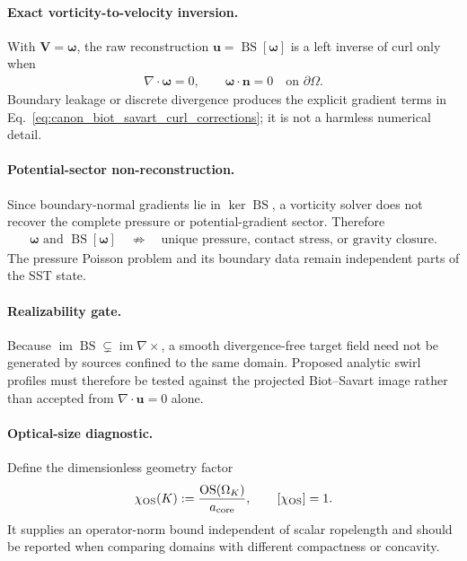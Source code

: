     \paragraph{Exact vorticity-to-velocity inversion.}
    With \(\mathbf V=\boldsymbol\omega\), the raw reconstruction
    \(\mathbf u=\operatorname{BS}[\boldsymbol\omega]\) is a left inverse of curl
    only when
    \begin{align}
        \nabla\cdot\boldsymbol\omega=0,
        \qquad
        \boldsymbol\omega\cdot\mathbf n=0
        \quad\text{on }\partial\Omega.
        \label{eq:rt_biot_savart_vorticity_conditions}
    \end{align}
    Boundary leakage or discrete divergence produces the explicit gradient terms in
    Eq.~\eqref{eq:canon_biot_savart_curl_corrections}; it is not a harmless numerical
    detail.

    \paragraph{Potential-sector non-reconstruction.}
    Since boundary-normal gradients lie in \(\ker\operatorname{BS}\), a vorticity
    solver does not recover the complete pressure or potential-gradient sector.
    Therefore
    \begin{align}
        \boldsymbol\omega
        \text{ and }
        \operatorname{BS}[\boldsymbol\omega]
        \quad\not\Rightarrow\quad
        \text{unique pressure, contact stress, or gravity closure}.
        \label{eq:rt_biot_savart_pressure_nonreconstruction}
    \end{align}
    The pressure Poisson problem and its boundary data remain independent parts of
    the SST state.

    \paragraph{Realizability gate.}
    Because
    \(\operatorname{im}\operatorname{BS}\subsetneq\operatorname{im}\nabla\times\),
    a smooth divergence-free target field need not be generated by sources confined
    to the same domain.  Proposed analytic swirl profiles must therefore be tested
    against the projected Biot--Savart image rather than accepted from
    \(\nabla\cdot\mathbf u=0\) alone.

    \paragraph{Optical-size diagnostic.}
    Define the dimensionless geometry factor
    \begin{align}
        \chi_{\rm OS}(K)
        :=
        \frac{\operatorname{OS}(\Omega_K)}{a_{\rm core}},
        \qquad
        [\chi_{\rm OS}]=1.
        \label{eq:rt_biot_savart_optical_size_factor}
    \end{align}
    It supplies an operator-norm bound independent of scalar ropelength and should be
    reported when comparing domains with different compactness or concavity.

